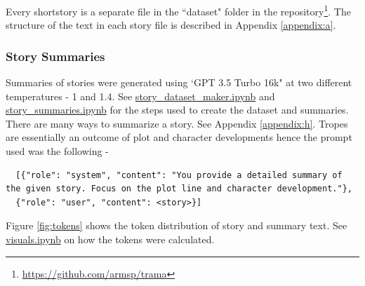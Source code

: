 \documentclass[11pt]{article}
\begin{document}
Every shortstory is a separate file in the ``dataset" folder in the repository\footnote[2]{\url{https://github.com/armsp/trama}}. The structure of the text in each story file is described in Appendix \ref{appendix:a}.

\subsubsection{Story Summaries}
Summaries of stories were generated using `GPT 3.5 Turbo 16k" at two different temperatures - 1 and 1.4. See \href{https://github.com/armsp/trama/blob/main/story_dataset_maker.ipynb}{story\_dataset\_maker.ipynb} and \href{https://github.com/armsp/trama/blob/main/story_summaries.ipynb}{story\_summaries.ipynb} for the steps used to create the dataset and summaries. There are many ways to summarize a story. See Appendix \ref{appendix:h}. Tropes are essentially an outcome of plot and character developments hence the prompt used was the following - 
\begin{lstlisting}
  [{"role": "system", "content": "You provide a detailed summary of the given story. Focus on the plot line and character development."},
  {"role": "user", "content": <story>}]
\end{lstlisting}
Figure \ref{fig:tokens} shows the token distribution of story and summary text. See \href{https://github.com/armsp/trama/blob/main/visuals.ipynb}{visuals.ipynb} on how the tokens were calculated.
\end{document}
